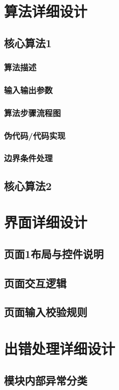 \documentclass{../template/softeng}
\begin{document}
\section{算法详细设计}
\subsection{核心算法1}
\subsubsection{算法描述}
\subsubsection{输入输出参数}
\subsubsection{算法步骤流程图}
\subsubsection{伪代码/代码实现}
\subsubsection{边界条件处理}

\subsection{核心算法2}

\section{界面详细设计}
\subsection{页面1布局与控件说明}
\subsection{页面交互逻辑}
\subsection{页面输入校验规则}

\section{出错处理详细设计}
\subsection{模块内部异常分类}
\end{document}
